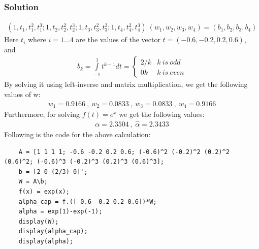 \documentclass{article}
\begin{document}
\subsubsection*{Solution}
\begin{align*}
    (1,t_1,t^2_1,t^3_1;1,t_2,t^2_2,t^3_2;1,t_3,t^2_3,t^3_3;1,t_4,t^2_4,t^3_4)\ (w_1,w_2,w_3,w_4) = (b_1,b_2,b_3,b_4)
\end{align*}
Here $t_i$ where $i=1\ldots 4$ are the values of the vector $t=(-0.6, -0.2, 0.2, 0.6)$, and 
\begin{align*}
    b_k = \int\limits_{-1}^{1} t^{k-1}dt = \begin{cases}
  2/k & k\ is\ odd\\    
  0 k & k\ is\ even
\end{cases}
\end{align*}
By solving it using left-inverse and matrix multiplication, we get the following values of w:
\begin{align*}
    w_1 = 0.9166\ ,\ w_2 = 0.0833\ ,\ w_3=0.0833\ ,\ w_4 = 0.9166
\end{align*}
Furthermore, for solving $f(t)=e^x$ we get the following values:
\begin{align*}
    \alpha = 2.3504\ ,\ \hat{\alpha}=2.3433
\end{align*}
Following is the code for the above calculation:
\begin{verbatim}
    A = [1 1 1 1; -0.6 -0.2 0.2 0.6; (-0.6)^2 (-0.2)^2 (0.2)^2 (0.6)^2; (-0.6)^3 (-0.2)^3 (0.2)^3 (0.6)^3];
    b = [2 0 (2/3) 0]';
    W = A\b;
    f(x) = exp(x);
    alpha_cap = f.([-0.6 -0.2 0.2 0.6])*W;
    alpha = exp(1)-exp(-1);
    display(W);
    display(alpha_cap);
    display(alpha);
    \end{verbatim}
\end{document}
